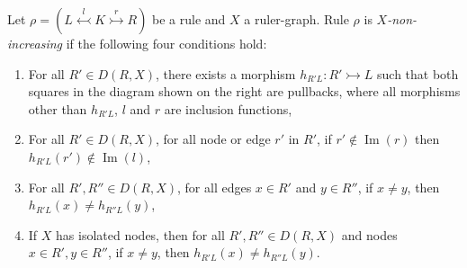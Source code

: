 \begin{definition}
    \label{def:creates_more_x_on_the_left}
    Let \(\rho = (L \overset{l}{\leftarrowtail} K \overset{r}{\rightarrowtail} R)\) be a rule and \(X\) a ruler-graph. 
    Rule \( \rho \) is \emph{\( X \)-non-increasing} if the following four conditions hold:
    \newline
    \vspace{1mm}
    \noindent
    \begin{minipage}{0.64\textwidth} 
    \begin{enumerate}
        \item For all $R' \in D(R,X)$, there exists a morphism \(h_{R'L}: R' \rightarrowtail L \) such that both squares in the diagram shown on the right are pullbacks, where all morphisms other than $h_{R'L}$, $l$ and $r$ are inclusion functions, 
        \item \label{def:non_increasing:non_clapse} For all $R' \in D(R,X)$, for all node or edge $r'$ in $R'$, if $ r' \notin \operatorname{Im}(r)$ then $h_{R'L}(r') \notin \operatorname{Im}(l)$,
        \item For all $R',R'' \in D(R,X)$, for all edges $x \in R'$ and $y \in R''$, if $x \neq y$, then $h_{R'L}(x) \neq h_{R''L}(y)$,
        \item If $X$ has isolated nodes, then for all $R',R'' \in D(R,X)$ and nodes $x \in R', y \in R''$, if $x \neq y$, then $h_{R'L}(x) \neq h_{R''L}(y)$.
    \end{enumerate} 
    \end{minipage}
    \hfill
    \begin{minipage}{0.4\textwidth}
        \begin{center}

\end{center}
\end{minipage}
\end{definition}
